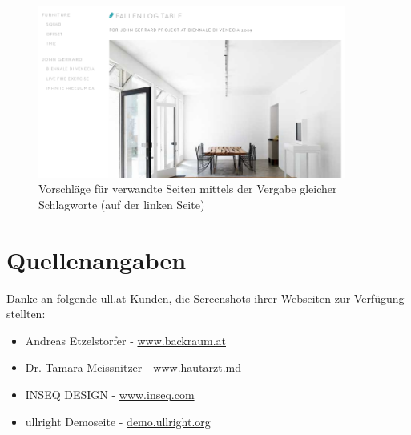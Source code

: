 \documentclass[article, a4paper, oneside, 11pt]{memoir}
\begin{document}
\begin{figure}[htp]
\centering
\includegraphics[width=0.9\textwidth]{recommendation}
\caption{Vorschläge für verwandte Seiten mittels der Vergabe gleicher Schlagworte (auf der linken Seite)}
\label{fig:recommendation}
\end{figure}



\section{Quellenangaben}

Danke an folgende ull.at Kunden, die Screenshots ihrer Webseiten zur Verfügung stellten:

\begin{itemize}
\item Andreas Etzelstorfer - \href{http://www.backraum.at}{www.backraum.at}
\item Dr. Tamara Meissnitzer - \href{http://www.hautarzt.md}{www.hautarzt.md}
\item INSEQ DESIGN - \href{http://www.inseq.com}{www.inseq.com}
\item ullright Demoseite - \href{http://demo.ullright.org}{demo.ullright.org}
\end{itemize}
\end{document}
